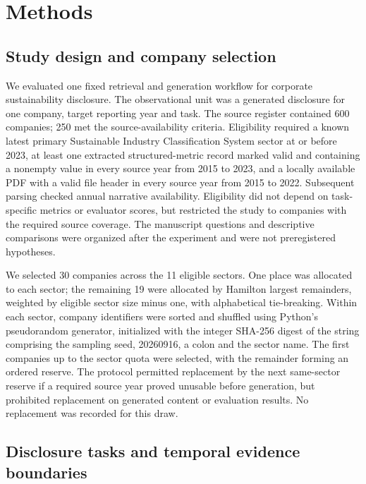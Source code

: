 \documentclass[11pt,a4paper]{article}
\begin{document}
\section*{Methods}

\subsection*{Study design and company selection}

We evaluated one fixed retrieval and generation workflow for corporate sustainability disclosure. The observational unit was a generated disclosure for one company, target reporting year and task. The source register contained 600 companies; 250 met the source-availability criteria. Eligibility required a known latest primary Sustainable Industry Classification System sector at or before 2023, at least one extracted structured-metric record marked valid and containing a nonempty value in every source year from 2015 to 2023, and a locally available PDF with a valid file header in every source year from 2015 to 2022. Subsequent parsing checked annual narrative availability. Eligibility did not depend on task-specific metrics or evaluator scores, but restricted the study to companies with the required source coverage. The manuscript questions and descriptive comparisons were organized after the experiment and were not preregistered hypotheses.

We selected 30 companies across the 11 eligible sectors. One place was allocated to each sector; the remaining 19 were allocated by Hamilton largest remainders, weighted by eligible sector size minus one, with alphabetical tie-breaking. Within each sector, company identifiers were sorted and shuffled using Python's pseudorandom generator, initialized with the integer SHA-256 digest of the string comprising the sampling seed, 20260916, a colon and the sector name. The first companies up to the sector quota were selected, with the remainder forming an ordered reserve. The protocol permitted replacement by the next same-sector reserve if a required source year proved unusable before generation, but prohibited replacement on generated content or evaluation results. No replacement was recorded for this draw.

\subsection*{Disclosure tasks and temporal evidence boundaries}
\end{document}
